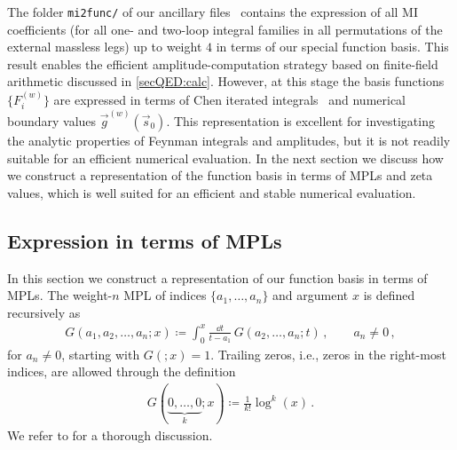 \documentclass[main.tex]{subfiles}
\begin{document}
The folder \texttt{mi2func/} of our ancillary files~\cite{zenodo} contains the expression of all \ac{MI} coefficients (for all one- and two-loop integral families in all permutations of the external massless legs) up to weight $4$ in terms of our special function basis. This result enables the efficient amplitude-computation strategy based on finite-field arithmetic discussed in \cref{secQED:calc}.
However, at this stage the basis functions $\{F^{(w)}_i\}$ are expressed in terms of Chen iterated integrals~\cite{Chen:1977oja} and numerical boundary values $\vec{g}^{(w)}(\vec{s}_0)$. This representation is excellent for investigating the analytic properties of Feynman integrals and amplitudes, but it is not readily suitable for an efficient numerical evaluation.
In the next section we discuss how we construct a representation of the function basis in terms of MPLs and zeta values, which is well suited for an efficient and stable numerical evaluation.


\subsection{Expression in terms of \aclp{MPL}}
\label{secQED:basis_MPLs}

In this section we construct a representation of our function basis in terms of MPLs. The weight-$n$ MPL of indices $\{a_1,\ldots,a_n\}$ and argument $x$ is defined recursively as
\begin{align} 
G(a_1,a_2,\ldots,a_n; x) \coloneqq \int_0^x \frac{\dd t}{t - a_1} \, G(a_2,\ldots,a_n; t) \,, \qquad a_n \neq 0 \,, 
\end{align}
for $a_n \neq 0$, starting with $G(;x) = 1$. Trailing zeros, i.e., zeros in the right-most indices, are allowed through the definition
\begin{align} \label{eqQED:trailingzeros}
G(\underbrace{0,\ldots,0}_{k}; x) \coloneqq \frac{1}{k!} \log^k(x) \,.
\end{align}
We refer to  for a thorough discussion.
\end{document}
